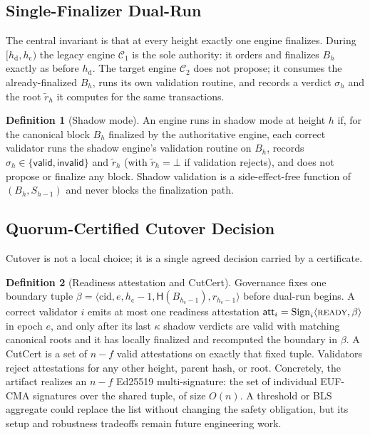 \documentclass[journal]{IEEEtran}
\theoremstyle{definition}
\newtheorem{definition}{Definition}
\theoremstyle{remark}
\begin{document}
\subsection{Single-Finalizer Dual-Run}
The central invariant is that at every height exactly one engine finalizes. During
$[h_{\mathrm{d}}, h_{\mathrm{c}})$ the legacy engine $\mathcal{C}_1$ is the sole authority: it
orders and finalizes $B_h$ exactly as before $h_{\mathrm{d}}$. The target engine
$\mathcal{C}_2$ does not propose; it consumes the already-finalized $B_h$, runs its own
validation routine, and records a verdict $\sigma_h$ and the root $\tilde r_h$ it computes for
the same transactions.

\begin{definition}[Shadow mode]
\label{def:shadow}
An engine runs in shadow mode at height $h$ if, for the canonical block $B_h$ finalized by the
authoritative engine, each correct validator runs the shadow engine's validation routine on
$B_h$, records $\sigma_h \in \{\mathsf{valid},\mathsf{invalid}\}$ and $\tilde r_h$ (with
$\tilde r_h=\bot$ if validation rejects), and does not propose or finalize any block. Shadow
validation is a side-effect-free function of $(B_h,S_{h-1})$ and never blocks the finalization
path.
\end{definition}

\subsection{Quorum-Certified Cutover Decision}
Cutover is not a local choice; it is a single agreed decision carried by a certificate.

\begin{definition}[Readiness attestation and CutCert]
\label{def:cutcert}
Governance fixes one boundary tuple
$\beta=\langle\mathrm{cid},e,h_{\mathrm{c}}-1,\mathsf{H}(B_{h_{\mathrm{c}}-1}),r_{h_{\mathrm{c}}-1}\rangle$
before dual-run begins. A correct validator $i$ emits at most one readiness attestation
$\mathsf{att}_i=\mathrm{Sign}_i\langle\textsc{ready},\beta\rangle$ in epoch $e$, and only after its
last $\kappa$ shadow verdicts are valid with matching canonical roots and it has locally finalized
and recomputed the boundary in $\beta$. A CutCert is a set of $n-f$ valid attestations on exactly
that fixed tuple. Validators reject attestations for any other height, parent hash, or root.
Concretely, the artifact realizes an $n-f$ Ed25519 multi-signature: the set of individual EUF-CMA
signatures over the shared tuple, of size $O(n)$. A threshold or BLS aggregate could replace the
list without changing the safety obligation, but its setup and robustness tradeoffs remain future
engineering work.
\end{definition}
\end{document}
